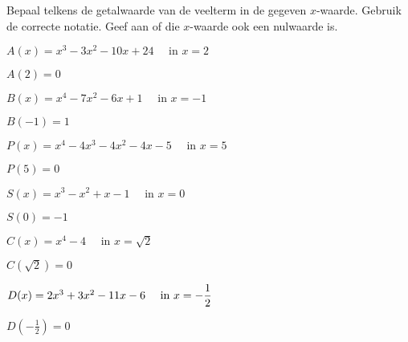 \documentclass{ximera}
\begin{document}
\begin{exercise}
	\renewcommand{\TJa }{\makebox[2.5cm]{nulwaarde}}
	\renewcommand{\TNee}{\makebox[2.5cm]{geen nulwaarde}}
		Bepaal telkens de getalwaarde van de veelterm in de gegeven $x$-waarde. Gebruik de correcte notatie. Geef aan of die $x$-waarde ook een nulwaarde is. 
		
		\begin{question} \( A(x) = x^3-3x^2-10x+24       \quad \text{ in }  x = 2               \)  \begin{uitkomst} \( A(2)=0                       \) \end{uitkomst} \end{question}
		\begin{question} \( B(x) = x^4-7x^2-6x+1         \quad \text{ in }  x = -1              \)  \begin{uitkomst} \( B(-1)=1                      \) \end{uitkomst} \end{question}
		\begin{question} \( P(x) = x^4-4x^3-4x^2-4x-5    \quad \text{ in }  x = 5               \)  \begin{uitkomst} \( P(5)=0                       \) \end{uitkomst} \end{question}
		\begin{question} \( S(x) = x^3-x^2+x-1           \quad \text{ in }  x = 0               \)  \begin{uitkomst} \( S(0)=-1                      \) \end{uitkomst} \end{question}
		\begin{question} \( C(x) = x^4-4                 \quad \text{ in }  x = \sqrt{2}        \)  \begin{uitkomst} \( C(\sqrt{2})=0                \) \end{uitkomst} \end{question}
		\begin{question} \( D(x) = 2x^3 + 3x^2 - 11x - 6 \quad \text{ in }  \displaystyle x = -\frac{1}{2} \)  \begin{uitkomst} \( D\left(-\frac{1}{2}\right)=0 \) \end{uitkomst} \end{question}
\end{exercise}
\end{document}
